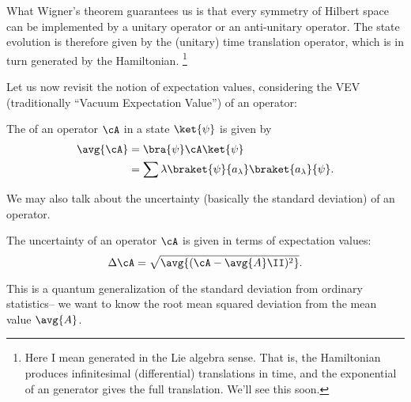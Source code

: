What Wigner's theorem guarantees us is that every symmetry of Hilbert space can be implemented by a unitary operator or an anti-unitary operator. The state evolution is therefore given by the (unitary) time translation operator, which is in turn generated by the Hamiltonian.%
    \footnote{Here I mean generated in the Lie algebra sense. That is, the Hamiltonian produces infinitesimal (differential) translations in time, and the exponential of an generator gives the full translation. We'll see this soon.}

Let us now revisit the notion of expectation values, considering the VEV (traditionally ``Vacuum Expectation Value'') of an operator:
\begin{defn}
    The  of an operator $\cA$ in a state $\ket{\psi}$ is given by
    \begin{align}
        \avg{\cA}&= \bra{\psi} \cA \ket{\psi}\\
            &= \sum \lambda \braket{\psi}{a_\lambda} \braket{a_\lambda}{\psi}.
    \end{align}
\end{defn}
We may also talk about the uncertainty (basically the standard deviation) of an operator.
\begin{defn}
    The uncertainty of an operator $\cA$ is given in terms of expectation values:
    \begin{equation}
        \Delta \cA =\sqrt{\avg{(\cA-\avg{A}\II)^2}}.
    \end{equation}
\end{defn}
This is a quantum generalization of the standard deviation from ordinary statistics-- we want to know the root mean squared deviation from the mean value $\avg{A}$.

